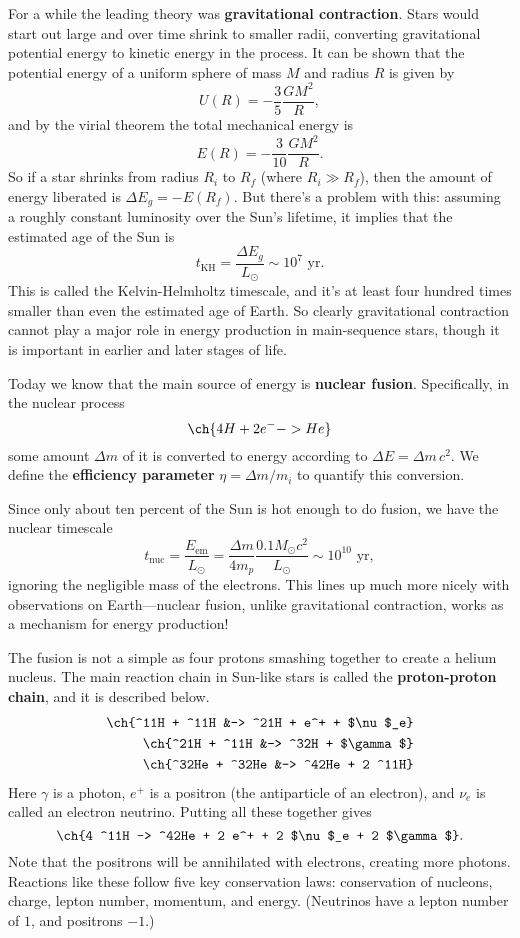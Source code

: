 \documentclass[../a062main.tex]{subfiles}
\begin{document}
For a while the leading theory was \textbf{gravitational contraction}.
Stars would start out large and over time shrink to smaller radii, converting gravitational potential energy to kinetic energy in the process.
It can be shown that the potential energy of a uniform sphere of mass $M$ and radius $R$ is given by
\[ U(R) = -\frac{3}{5} \frac{GM^2}{R}, \]
and by the virial theorem the total mechanical energy is
\[ E(R) = -\frac{3}{10} \frac{GM^2}{R}. \]
So if a star shrinks from radius $R_i$ to $R_f$ (where $R_i \gg R_f$), then the amount of energy liberated is $\Delta E_g = -E(R_f)$.
But there's a problem with this: assuming a roughly constant luminosity over the Sun's lifetime, it implies that the estimated age of the Sun is
\[ t_\textrm{KH} = \frac{\Delta E_g}{L_\odot} \sim 10^{7} \text{ yr}. \]
This is called the Kelvin-Helmholtz timescale, and it's at least four hundred times smaller than even the estimated age of Earth.
So clearly gravitational contraction cannot play a major role in energy production in main-sequence stars, though it is important in earlier and later stages of life.

Today we know that the main source of energy is \textbf{nuclear fusion}.
Specifically, in the nuclear process
\[ \ch{4 H + 2 e^- -> He} \]
some amount $\Delta m$ of it is converted to energy according to $\Delta E = \Delta m \,c^2$.
We define the \textbf{efficiency parameter} $\eta = \Delta m / m_i$ to quantify this conversion.

Since only about ten percent of the Sun is hot enough to do fusion, we have the nuclear timescale
\[ t_\textrm{nuc} = \frac{E_\textrm{em}}{L_\odot} = \frac{\Delta m}{4m_p} \frac{0.1 M_\odot c^2}{L_\odot} \sim 10^{10} \text{ yr}, \]
ignoring the negligible mass of the electrons.
This lines up much more nicely with observations on Earth---nuclear fusion, unlike gravitational contraction, works as a mechanism for energy production!

The fusion is not a simple as four protons smashing together to create a helium nucleus.
The main reaction chain in Sun-like stars is called the \textbf{proton-proton chain}, and it is described below.
\begin{align*}
    \ch{^11H + ^11H &-> ^21H + e^+ + $\nu$_e} \\
    \ch{^21H + ^11H &-> ^32H + $\gamma$} \\
    \ch{^32He + ^32He &-> ^42He + 2 ^11H}
\end{align*}
Here $\gamma$ is a photon, $e^+$ is a positron (the antiparticle of an electron), and $\nu_e$ is called an electron neutrino.
Putting all these together gives
\[ \ch{4 ^11H -> ^42He + 2 e^+ + 2 $\nu$_e + 2 $\gamma$}. \]
Note that the positrons will be annihilated with electrons, creating more photons.
Reactions like these follow five key conservation laws: conservation of nucleons, charge, lepton number, momentum, and energy.
(Neutrinos have a lepton number of $1$, and positrons $-1$.)
\end{document}
